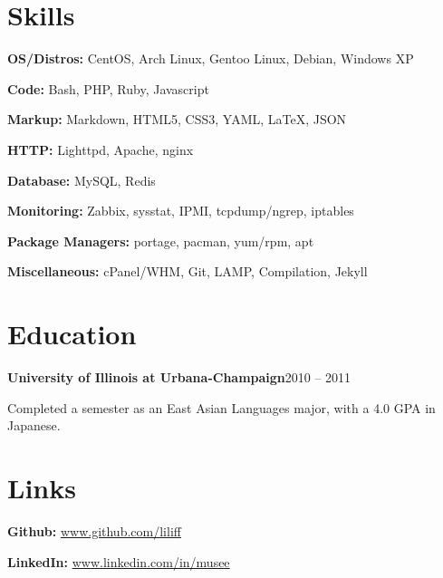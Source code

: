 \documentclass{article}
\newenvironment{entity}[2]{%
    \textbf{#1}\hfill #2\par
}{
    \vspace{0.1em}%
    \par%
}
\begin{document}
\section{Skills}

\textbf{OS/Distros:} CentOS, Arch Linux, Gentoo Linux, Debian, Windows XP\par
\textbf{Code:} Bash, PHP, Ruby, Javascript\par
\textbf{Markup:} Markdown, HTML5, CSS3, YAML, \LaTeX, JSON\par
\textbf{HTTP:} Lighttpd, Apache, nginx\par
\textbf{Database:} MySQL, Redis\par
\textbf{Monitoring:} Zabbix, sysstat, IPMI, tcpdump/ngrep, iptables\par
\textbf{Package Managers:} portage, pacman, yum/rpm, apt\par
\textbf{Miscellaneous:} cPanel/WHM, Git, LAMP, Compilation, Jekyll
\section{Education}

    \begin{entity}{University of Illinois at Urbana-Champaign}{2010 -- 2011}

Completed a semester as an East Asian Languages major, with a 4.0 GPA in Japanese.

    \end{entity}
\section{Links}

\textbf{Github:} \url{www.github.com/liliff}\par
\textbf{LinkedIn:} \url{www.linkedin.com/in/musee}
\end{document}
